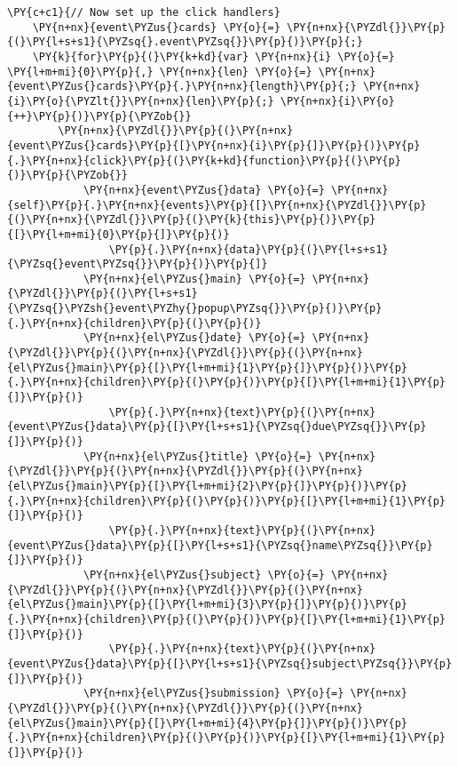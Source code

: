 \begin{Verbatim}[commandchars=\\\{\}]
    \PY{c+c1}{// Now set up the click handlers}
    \PY{n+nx}{event\PYZus{}cards} \PY{o}{=} \PY{n+nx}{\PYZdl{}}\PY{p}{(}\PY{l+s+s1}{\PYZsq{}.event\PYZsq{}}\PY{p}{)}\PY{p}{;}
    \PY{k}{for}\PY{p}{(}\PY{k+kd}{var} \PY{n+nx}{i} \PY{o}{=} \PY{l+m+mi}{0}\PY{p}{,} \PY{n+nx}{len} \PY{o}{=} \PY{n+nx}{event\PYZus{}cards}\PY{p}{.}\PY{n+nx}{length}\PY{p}{;} \PY{n+nx}{i}\PY{o}{\PYZlt{}}\PY{n+nx}{len}\PY{p}{;} \PY{n+nx}{i}\PY{o}{++}\PY{p}{)}\PY{p}{\PYZob{}}
        \PY{n+nx}{\PYZdl{}}\PY{p}{(}\PY{n+nx}{event\PYZus{}cards}\PY{p}{[}\PY{n+nx}{i}\PY{p}{]}\PY{p}{)}\PY{p}{.}\PY{n+nx}{click}\PY{p}{(}\PY{k+kd}{function}\PY{p}{(}\PY{p}{)}\PY{p}{\PYZob{}}
            \PY{n+nx}{event\PYZus{}data} \PY{o}{=} \PY{n+nx}{self}\PY{p}{.}\PY{n+nx}{events}\PY{p}{[}\PY{n+nx}{\PYZdl{}}\PY{p}{(}\PY{n+nx}{\PYZdl{}}\PY{p}{(}\PY{k}{this}\PY{p}{)}\PY{p}{[}\PY{l+m+mi}{0}\PY{p}{]}\PY{p}{)}
                \PY{p}{.}\PY{n+nx}{data}\PY{p}{(}\PY{l+s+s1}{\PYZsq{}event\PYZsq{}}\PY{p}{)}\PY{p}{]}
            \PY{n+nx}{el\PYZus{}main} \PY{o}{=} \PY{n+nx}{\PYZdl{}}\PY{p}{(}\PY{l+s+s1}{\PYZsq{}\PYZsh{}event\PYZhy{}popup\PYZsq{}}\PY{p}{)}\PY{p}{.}\PY{n+nx}{children}\PY{p}{(}\PY{p}{)}
            \PY{n+nx}{el\PYZus{}date} \PY{o}{=} \PY{n+nx}{\PYZdl{}}\PY{p}{(}\PY{n+nx}{\PYZdl{}}\PY{p}{(}\PY{n+nx}{el\PYZus{}main}\PY{p}{[}\PY{l+m+mi}{1}\PY{p}{]}\PY{p}{)}\PY{p}{.}\PY{n+nx}{children}\PY{p}{(}\PY{p}{)}\PY{p}{[}\PY{l+m+mi}{1}\PY{p}{]}\PY{p}{)}
                \PY{p}{.}\PY{n+nx}{text}\PY{p}{(}\PY{n+nx}{event\PYZus{}data}\PY{p}{[}\PY{l+s+s1}{\PYZsq{}due\PYZsq{}}\PY{p}{]}\PY{p}{)}
            \PY{n+nx}{el\PYZus{}title} \PY{o}{=} \PY{n+nx}{\PYZdl{}}\PY{p}{(}\PY{n+nx}{\PYZdl{}}\PY{p}{(}\PY{n+nx}{el\PYZus{}main}\PY{p}{[}\PY{l+m+mi}{2}\PY{p}{]}\PY{p}{)}\PY{p}{.}\PY{n+nx}{children}\PY{p}{(}\PY{p}{)}\PY{p}{[}\PY{l+m+mi}{1}\PY{p}{]}\PY{p}{)}
                \PY{p}{.}\PY{n+nx}{text}\PY{p}{(}\PY{n+nx}{event\PYZus{}data}\PY{p}{[}\PY{l+s+s1}{\PYZsq{}name\PYZsq{}}\PY{p}{]}\PY{p}{)}
            \PY{n+nx}{el\PYZus{}subject} \PY{o}{=} \PY{n+nx}{\PYZdl{}}\PY{p}{(}\PY{n+nx}{\PYZdl{}}\PY{p}{(}\PY{n+nx}{el\PYZus{}main}\PY{p}{[}\PY{l+m+mi}{3}\PY{p}{]}\PY{p}{)}\PY{p}{.}\PY{n+nx}{children}\PY{p}{(}\PY{p}{)}\PY{p}{[}\PY{l+m+mi}{1}\PY{p}{]}\PY{p}{)}
                \PY{p}{.}\PY{n+nx}{text}\PY{p}{(}\PY{n+nx}{event\PYZus{}data}\PY{p}{[}\PY{l+s+s1}{\PYZsq{}subject\PYZsq{}}\PY{p}{]}\PY{p}{)}
            \PY{n+nx}{el\PYZus{}submission} \PY{o}{=} \PY{n+nx}{\PYZdl{}}\PY{p}{(}\PY{n+nx}{\PYZdl{}}\PY{p}{(}\PY{n+nx}{el\PYZus{}main}\PY{p}{[}\PY{l+m+mi}{4}\PY{p}{]}\PY{p}{)}\PY{p}{.}\PY{n+nx}{children}\PY{p}{(}\PY{p}{)}\PY{p}{[}\PY{l+m+mi}{1}\PY{p}{]}\PY{p}{)}

\end{Verbatim}

